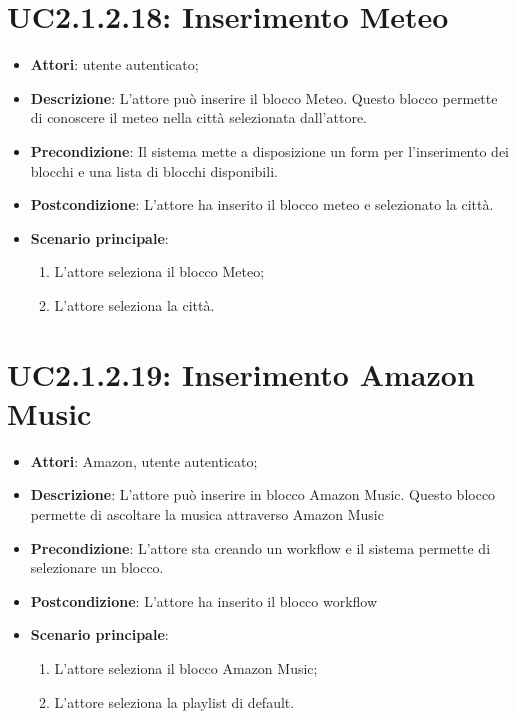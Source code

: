 \section{UC2.1.2.18: Inserimento Meteo}
\label{UC2.1.2.18}
\begin{itemize}
	\item \textbf{Attori}: utente autenticato;
	\item \textbf{Descrizione}: L'attore può inserire il blocco Meteo. Questo blocco permette di conoscere il meteo nella città selezionata dall'attore.
	\item \textbf{Precondizione}: Il sistema mette a disposizione un form per l'inserimento dei blocchi e una lista di blocchi disponibili.	
	\item \textbf{Postcondizione}: L'attore ha inserito il blocco meteo e selezionato la città.
	\item \textbf{Scenario principale}:
	\begin{enumerate} \item L'attore seleziona il blocco Meteo;  \item  L'attore seleziona la città.\end{enumerate}
\end{itemize}

\section{UC2.1.2.19: Inserimento Amazon Music}
\label{UC2.1.2.19}
\begin{itemize}
	\item \textbf{Attori}: Amazon, utente autenticato;
	\item \textbf{Descrizione}: L'attore può inserire in blocco Amazon Music. Questo blocco permette di ascoltare la musica attraverso Amazon Music
	\item \textbf{Precondizione}: L'attore sta creando un workflow e il sistema permette di selezionare un blocco.	
	\item \textbf{Postcondizione}: L'attore ha inserito il blocco workflow
	\item \textbf{Scenario principale}:
	\begin{enumerate} \item L'attore seleziona il blocco Amazon Music;  \item  L'attore seleziona la playlist di default.\end{enumerate}
\end{itemize}

